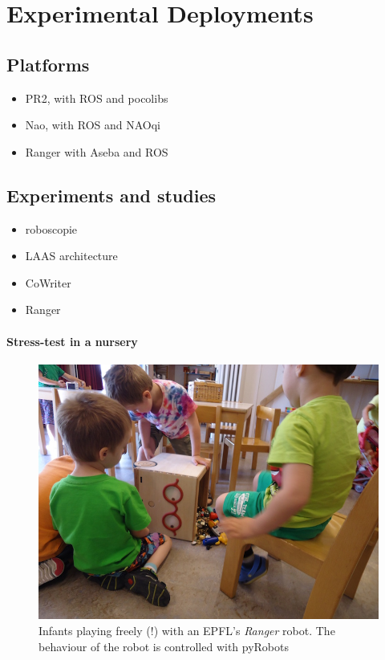 \documentclass[a4paper, 10pt, conference]{ieeeconf}      %
\newcommand{\pyRobots}{{{\sc pyRobots}}}
\begin{document}
\section{Experimental Deployments}

\subsection{Platforms}

\begin{itemize}
    \item PR2, with ROS and pocolibs
    \item Nao, with ROS and NAOqi
    \item Ranger with Aseba and ROS
\end{itemize}

\subsection{Experiments and studies}

\begin{itemize}
    \item roboscopie
    \item LAAS architecture
    \item CoWriter
    \item Ranger
\end{itemize}

\paragraph{Stress-test in a nursery}

\begin{figure}
        \centering
        \includegraphics[width=0.9\columnwidth]{ranger-side}
        \caption{Infants playing freely (!) with an EPFL's \emph{Ranger} robot.
        The behaviour of the robot is controlled with \pyRobots}
        \label{expe-nursery}
\end{figure}
\end{document}
